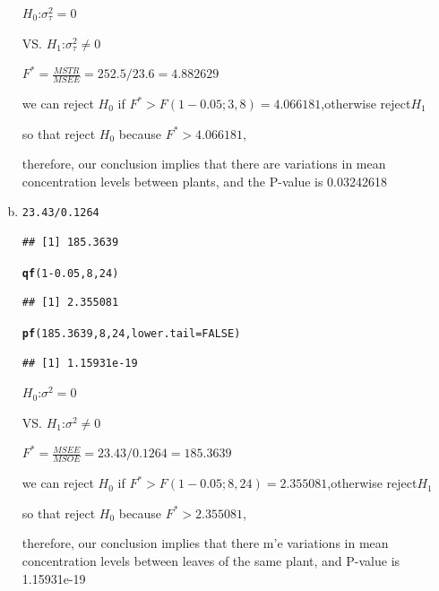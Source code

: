 \documentclass{article}\usepackage[]{graphicx}\usepackage[]{color}
\makeatletter
\newcommand{\hlnum}[1]{\textcolor[rgb]{0.686,0.059,0.569}{#1}}%
\newcommand{\hlopt}[1]{\textcolor[rgb]{0,0,0}{#1}}%
\newcommand{\hlstd}[1]{\textcolor[rgb]{0.345,0.345,0.345}{#1}}%
\newcommand{\hlkwc}[1]{\textcolor[rgb]{0.333,0.667,0.333}{#1}}%
\newcommand{\hlkwd}[1]{\textcolor[rgb]{0.737,0.353,0.396}{\textbf{#1}}}%
\newenvironment{kframe}{%
 \def\at@end@of@kframe{}%
 \ifinner\ifhmode%
  \def\at@end@of@kframe{\end{minipage}}%
  \begin{minipage}{\columnwidth}%
 \fi\fi%
 \def\FrameCommand##1{\hskip\@totalleftmargin \hskip-\fboxsep
 \colorbox{shadecolor}{##1}\hskip-\fboxsep
     \hskip-\linewidth \hskip-\@totalleftmargin \hskip\columnwidth}%
 \MakeFramed {\advance\hsize-\width
   \@totalleftmargin\z@ \linewidth\hsize
   \@setminipage}}%
 {\par\unskip\endMakeFramed%
 \at@end@of@kframe}
\newenvironment{knitrout}{}{} %
\makeatother
\begin{document}
\begin{enumerate}[(a)]
\begin{center}
$H_0$:$\sigma^2_\tau = 0$

VS. $H_1$:$\sigma^2_\tau \ne 0$

$F^*=\frac{MSTR}{MSEE} = 252.5/23.6  = 4.882629$

we can reject $H_0$ if $F^* > F(1-0.05;3,8)=4.066181$,otherwise reject$H_1$

so that reject $H_0$ because $F^*>4.066181$,

therefore, our conclusion implies that there are variations in mean concentration levels between plants, and the P-value is 0.03242618
\end{center}

\item

\begin{knitrout}
\color{fgcolor}\begin{kframe}
\begin{alltt}
  \hlnum{23.43}\hlopt{/}\hlnum{0.1264}
\end{alltt}
\begin{verbatim}
## [1] 185.3639
\end{verbatim}
\begin{alltt}
  \hlkwd{qf}\hlstd{(}\hlnum{1}\hlopt{-}\hlnum{0.05}\hlstd{,} \hlnum{8}\hlstd{,} \hlnum{24}\hlstd{)}
\end{alltt}
\begin{verbatim}
## [1] 2.355081
\end{verbatim}
\begin{alltt}
  \hlkwd{pf}\hlstd{(}\hlnum{185.3639}\hlstd{,} \hlnum{8}\hlstd{,} \hlnum{24}\hlstd{,} \hlkwc{lower.tail} \hlstd{=} \hlnum{FALSE}\hlstd{)}
\end{alltt}
\begin{verbatim}
## [1] 1.15931e-19
\end{verbatim}
\end{kframe}
\end{knitrout}

\begin{center}
$H_0$:$\sigma^2 = 0$

VS. $H_1$:$\sigma^2 \ne 0$

$F^*=\frac{MSEE}{MSOE} = 23.43/0.1264  = 185.3639$

we can reject $H_0$ if $F^* > F(1-0.05;8,24)=2.355081$,otherwise reject$H_1$

so that reject $H_0$ because $F^*>2.355081$,

therefore, our conclusion implies that there m'e variations in mean concentration levels between leaves of the same plant, and P-value is 1.15931e-19
\end{center}


\end{enumerate}
\end{document}

